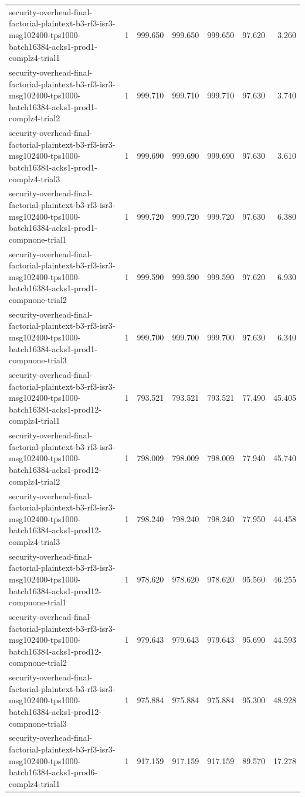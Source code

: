 \begin{tabular}{lrrrrrr}
security-overhead-final-factorial-plaintext-b3-rf3-isr3-msg102400-tps1000-batch16384-acks1-prod1-complz4-trial1 & 1 & 999.650 & 999.650 & 999.650 & 97.620 & 3.260 \\
security-overhead-final-factorial-plaintext-b3-rf3-isr3-msg102400-tps1000-batch16384-acks1-prod1-complz4-trial2 & 1 & 999.710 & 999.710 & 999.710 & 97.630 & 3.740 \\
security-overhead-final-factorial-plaintext-b3-rf3-isr3-msg102400-tps1000-batch16384-acks1-prod1-complz4-trial3 & 1 & 999.690 & 999.690 & 999.690 & 97.630 & 3.610 \\
security-overhead-final-factorial-plaintext-b3-rf3-isr3-msg102400-tps1000-batch16384-acks1-prod1-compnone-trial1 & 1 & 999.720 & 999.720 & 999.720 & 97.630 & 6.380 \\
security-overhead-final-factorial-plaintext-b3-rf3-isr3-msg102400-tps1000-batch16384-acks1-prod1-compnone-trial2 & 1 & 999.590 & 999.590 & 999.590 & 97.620 & 6.930 \\
security-overhead-final-factorial-plaintext-b3-rf3-isr3-msg102400-tps1000-batch16384-acks1-prod1-compnone-trial3 & 1 & 999.700 & 999.700 & 999.700 & 97.630 & 6.340 \\
security-overhead-final-factorial-plaintext-b3-rf3-isr3-msg102400-tps1000-batch16384-acks1-prod12-complz4-trial1 & 1 & 793.521 & 793.521 & 793.521 & 77.490 & 45.405 \\
security-overhead-final-factorial-plaintext-b3-rf3-isr3-msg102400-tps1000-batch16384-acks1-prod12-complz4-trial2 & 1 & 798.009 & 798.009 & 798.009 & 77.940 & 45.740 \\
security-overhead-final-factorial-plaintext-b3-rf3-isr3-msg102400-tps1000-batch16384-acks1-prod12-complz4-trial3 & 1 & 798.240 & 798.240 & 798.240 & 77.950 & 44.458 \\
security-overhead-final-factorial-plaintext-b3-rf3-isr3-msg102400-tps1000-batch16384-acks1-prod12-compnone-trial1 & 1 & 978.620 & 978.620 & 978.620 & 95.560 & 46.255 \\
security-overhead-final-factorial-plaintext-b3-rf3-isr3-msg102400-tps1000-batch16384-acks1-prod12-compnone-trial2 & 1 & 979.643 & 979.643 & 979.643 & 95.690 & 44.593 \\
security-overhead-final-factorial-plaintext-b3-rf3-isr3-msg102400-tps1000-batch16384-acks1-prod12-compnone-trial3 & 1 & 975.884 & 975.884 & 975.884 & 95.300 & 48.928 \\
security-overhead-final-factorial-plaintext-b3-rf3-isr3-msg102400-tps1000-batch16384-acks1-prod6-complz4-trial1 & 1 & 917.159 & 917.159 & 917.159 & 89.570 & 17.278 \\

\end{tabular}
